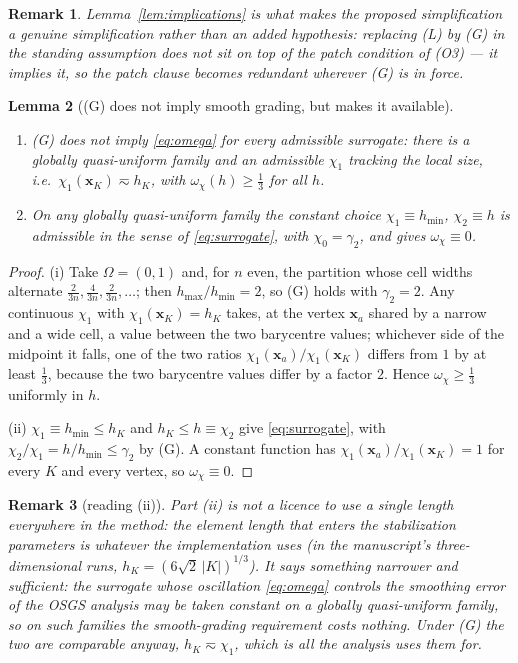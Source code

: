 \documentclass[11pt,a4paper]{article}
\newtheorem{lemma}{Lemma}
\newtheorem{remark}[lemma]{Remark}
\theoremstyle{definition}
\newcommand{\bx}{\boldsymbol{x}}
\begin{document}
\begin{remark}
Lemma~\ref{lem:implications} is what makes the proposed simplification a genuine
\emph{simplification} rather than an added hypothesis: replacing (L) by (G) in the standing
assumption does not sit \emph{on top of} the patch condition of (O3) --- it \emph{implies} it, so the
patch clause becomes redundant wherever (G) is in force.
\end{remark}

\begin{lemma}[(G) does not imply smooth grading, but makes it available]\label{lem:surrogate}
\phantom{x}
\begin{enumerate}
\item[(i)] (G) does not imply \eqref{eq:omega} for every admissible surrogate: there is a globally
quasi-uniform family and an admissible $\chi_1$ tracking the local size, i.e.\
$\chi_1(\bx_K)\eqsim h_K$, with $\omega_\chi(h)\ge\tfrac13$ for all $h$.
\item[(ii)] On any globally quasi-uniform family the \emph{constant} choice
$\chi_1\equiv h_{\min}$, $\chi_2\equiv h$ is admissible in the sense of \eqref{eq:surrogate}, with
$\chi_0=\gamma_2$, and gives $\omega_\chi\equiv0$.
\end{enumerate}
\end{lemma}

\begin{proof}
(i) Take $\Omega=(0,1)$ and, for $n$ even, the partition whose cell widths alternate
$\tfrac{2}{3n},\tfrac{4}{3n},\tfrac{2}{3n},\dots$; then $h_{\max}/h_{\min}=2$, so (G) holds with
$\gamma_2=2$. Any continuous $\chi_1$ with $\chi_1(\bx_K)=h_K$ takes, at the vertex $\bx_a$ shared by
a narrow and a wide cell, a value between the two barycentre values; whichever side of the midpoint
it falls, one of the two ratios $\chi_1(\bx_a)/\chi_1(\bx_K)$ differs from $1$ by at least
$\tfrac13$, because the two barycentre values differ by a factor $2$. Hence
$\omega_\chi\ge\tfrac13$ uniformly in $h$.

(ii) $\chi_1\equiv h_{\min}\le h_K$ and $h_K\le h\equiv\chi_2$ give \eqref{eq:surrogate}, with
$\chi_2/\chi_1=h/h_{\min}\le\gamma_2$ by (G). A constant function has
$\chi_1(\bx_a)/\chi_1(\bx_K)=1$ for every $K$ and every vertex, so $\omega_\chi\equiv0$.
\end{proof}

\begin{remark}[reading (ii)]
Part (ii) is not a licence to use a single length everywhere in the \emph{method}: the element length
that enters the stabilization parameters is whatever the implementation uses (in the manuscript's
three-dimensional runs, $h_K=(6\sqrt2\,|K|)^{1/3}$). It says something narrower and sufficient: the
\emph{surrogate} whose oscillation \eqref{eq:omega} controls the smoothing error of the OSGS analysis
may be taken constant on a globally quasi-uniform family, so on such families the smooth-grading
requirement costs nothing. Under (G) the two are comparable anyway, $h_K\eqsim\chi_1$, which is all
the analysis uses them for.
\end{remark}
\end{document}
